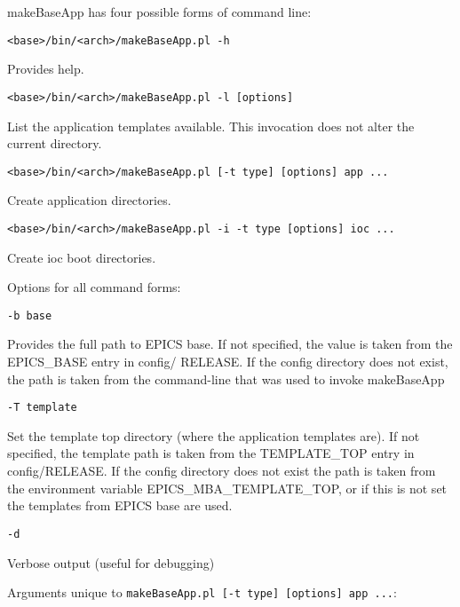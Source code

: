 makeBaseApp has four possible forms of command line:

\begin{verbatim}<base>/bin/<arch>/makeBaseApp.pl -h
\end{verbatim} Provides help.

\begin{verbatim}<base>/bin/<arch>/makeBaseApp.pl -l [options]
\end{verbatim} List the application templates available. This invocation does not alter the current directory.

\begin{verbatim}<base>/bin/<arch>/makeBaseApp.pl [-t type] [options] app ... 
\end{verbatim}Create application directories.

\begin{verbatim}<base>/bin/<arch>/makeBaseApp.pl -i -t type [options] ioc ... 
\end{verbatim}Create ioc boot directories.

Options for all command forms:

\begin{verbatim}-b base     
\end{verbatim}\begin{description}\item Provides the full path to EPICS base. If not specified, the value is taken from the EPICS\_BASE entry in config/
RELEASE. If the config directory does not exist, the path is taken from the command-line that was used to invoke 
makeBaseApp

\end{description}\begin{verbatim}-T template     
\end{verbatim}\begin{description}\item Set the template top directory (where the application templates are). If not specified, the template path is taken 
from the TEMPLATE\_TOP entry in config/RELEASE. If the config directory does not exist the path is taken from 
the environment variable EPICS\_MBA\_TEMPLATE\_TOP, or if this is not set the templates from EPICS base are 
used.

\end{description}\begin{verbatim}-d 
\end{verbatim}\begin{description}\item Verbose output (useful for debugging)

\end{description}Arguments unique to \verb|makeBaseApp.pl [-t type] [options] app ...|:

